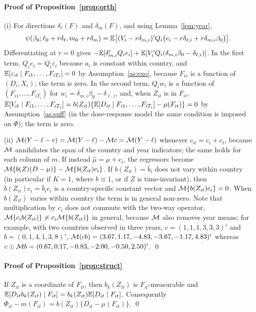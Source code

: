 \documentclass[preprint,12pt,authoryear]{elsarticle}
\begin{document}
\paragraph{Proof of Proposition~\ref{prop:orth}}
(i) For directions $\delta_\ell(F)$ and $\delta_m(F)$, and using Lemma~\ref{lem:year},
\[
\psi(\beta_0;\ell_0+r\delta_\ell,m_0+r\delta_m)=\mathbb{E}\big[(V_i-r\delta_{m,i})'Q_i\big(e_i-r\delta_{\ell,i}+r\delta_{m,i}\beta_0\big)\big].
\]
Differentiating at $r=0$ gives $-\mathbb{E}[\delta_{m,i}'Q_ie_i]+\mathbb{E}[V_i'Q_i(\delta_{m,i}\beta_0-\delta_{\ell,i})]$. In the first term, $Q_ie_i=Q_i\varepsilon_i$ because $a_i$ is constant within country, and $\mathbb{E}[\varepsilon_{it}\mid F_{i1},\dots,F_{iT_i}]=0$ by Assumption~\ref{as:exo}, because $F_{is}$ is a function of $(D_i,X_i)$; the term is zero. In the second term, $Q_iw_i$ is a function of $(F_{i1},\dots,F_{iT_i})$ for $w_i=\delta_{m,i}\beta_0-\delta_{\ell,i}$, and, when $Z_{it}$ is in $F_{it}$, $\mathbb{E}[V_{it}\mid F_{i1},\dots,F_{iT_i}]=b(Z_{it})\{\mathbb{E}[D_{it}\mid F_{i1},\dots,F_{iT_i}]-\mu(F_{it})\}=0$ by Assumption~\ref{as:suff} (in the dose-response model the same condition is imposed on $\Phi$); the term is zero.

(ii) $\mathcal{M}(Y-\ell-c)=\mathcal{M}(Y-\ell)-\mathcal{M} c=\mathcal{M}(Y-\ell)$ whenever $c_{it}=c_i+c_t$, because $\mathcal{M}$ annihilates the span of the country and year indicators; the same holds for each column of $m$. If instead $\hat\mu=\mu+c_i$, the regressors become $\mathcal{M}\{b(Z)(D-\mu)\}-\mathcal{M}\{b(Z_{it})c_i\}$. If $b(Z_{it})=\bar b_i$ does not vary within country (in particular if $K=1$, where $b\equiv1$, or if $Z$ is time-invariant), then $b(Z_{it})c_i=\bar b_ic_i$ is a country-specific constant vector and $\mathcal{M}\{b(Z_{it})c_i\}=0$. When $b(Z_{it})$ varies within country the term is in general non-zero. Note that multiplication by $c_i$ does not commute with the two-way operator, $\mathcal{M}\{c_ib(Z_{it})\}\neq c_i\mathcal{M}\{b(Z_{it})\}$ in general, because $\mathcal{M}$ also removes year means; for example, with two countries observed in three years, $c=(1,1,1,3,3,3)'$ and $b=(0,1,4,1,3,8)'$, $\mathcal{M}(cb)=(3.67,1.17,-4.83,-3.67,-1.17,4.83)'$ whereas $c\odot\mathcal{M} b=(0.67,0.17,-0.83,-2.00,-0.50,2.50)'$. \qed

\paragraph{Proof of Proposition~\ref{prop:struct}}
If $Z_{it}$ is a coordinate of $F_{it}$, then $b_k(Z_{it})$ is $F_{it}$-measurable and $\mathbb{E}[D_{it}b_k(Z_{it})\mid F_{it}]=b_k(Z_{it})\mathbb{E}[D_{it}\mid F_{it}]$. Consequently $\Phi_{it}-m(F_{it})=b(Z_{it})\{D_{it}-\mu(F_{it})\}$. \qed
\end{document}
